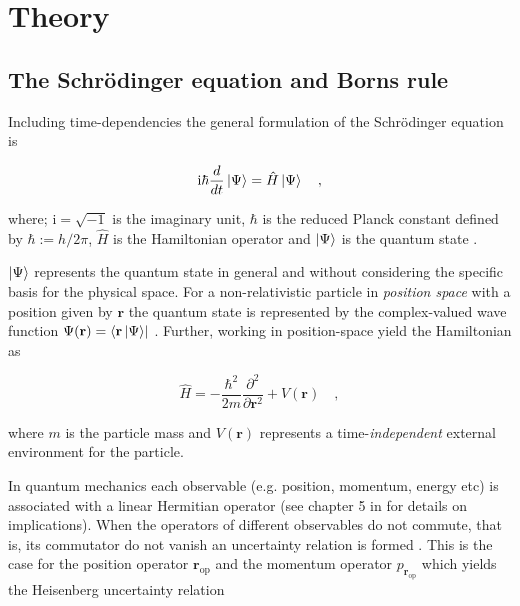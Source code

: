 \documentclass[../main_proj5.tex]{subfiles}
\begin{document}
\section{Theory}\label{sec:p5_theory}


\subsection{The Schr\"{o}dinger equation and Borns rule}

Including time-dependencies the general formulation of the Schr\"odinger equation is 

\begin{equation}
\label{eq:p5_general_schrodinger}
    \text{i} \hbar \frac{d}{dt} \ket{\Psi} = \hat{H} \ket{\Psi} \quad ,
\end{equation}

\noindent where; $\text{i} = \sqrt{-1}$ is the imaginary unit, $\hbar$ is the reduced Planck constant defined by $\hbar:= h/2\pi$, $\hat{H}$ is the Hamiltonian operator and $\ket{\Psi}$ is the quantum state \cite{prosjekttbeskrivelse5}. 

$\ket{\Psi}$ represents the quantum state in general and without considering the specific basis for the physical space. For a non-relativistic particle in \textit{position space} with a position given by $\mathbf{r}$ the quantum state is represented by the complex-valued wave function $\Psi(\mathbf{r})= \bra{\mathbf{r}\ket{\Psi}}$ \cite{prosjekttbeskrivelse5}. Further, working in position-space yield the Hamiltonian as 

\begin{equation}
\label{eq:p5_hamiltonian}
    \hat{H} = - \frac{\hbar^{2}}{2m} \frac{\partial^{2}}{\partial\mathbf{r}^{2}} +V(\mathbf{r}) \quad,
\end{equation}

\noindent where $m$ is the particle mass and $V(\mathbf{r})$ represents a time-\textit{independent} external environment for the particle. 

In quantum mechanics each observable (e.g. position, momentum, energy etc) is associated with a linear Hermitian operator (see chapter 5 in \cite{townsend2010quantum} for details on implications). When the operators of different observables do not commute, that is, its commutator do not vanish an uncertainty relation is formed \cite{townsend2010quantum}. This is the case for the position operator $\mathbf{r}_{\operatorname{op}}$ and the momentum operator $p_{\mathbf{r}_{\operatorname{op}}}$ which yields the Heisenberg uncertainty relation 
\end{document}
